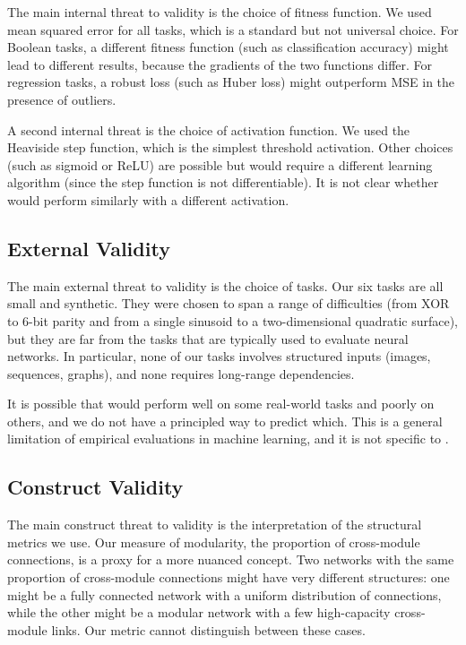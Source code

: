 The main internal threat to validity is the choice of fitness
function. We used mean squared error for all tasks, which is a
standard but not universal choice. For Boolean tasks, a different
fitness function (such as classification accuracy) might lead to
different results, because the gradients of the two functions differ.
For regression tasks, a robust loss (such as Huber loss) might
outperform MSE in the presence of outliers.

A second internal threat is the choice of activation function. We
used the Heaviside step function, which is the simplest threshold
activation. Other choices (such as sigmoid or ReLU) are possible but
would require a different learning algorithm (since the step function
is not differentiable). It is not clear whether \modnet{} would
perform similarly with a different activation.

\subsection{External Validity}
\label{sec:threats-external}

The main external threat to validity is the choice of tasks. Our six
tasks are all small and synthetic. They were chosen to span a range
of difficulties (from XOR to 6-bit parity and from a single sinusoid
to a two-dimensional quadratic surface), but they are far from the
tasks that are typically used to evaluate neural networks. In
particular, none of our tasks involves structured inputs (images,
sequences, graphs), and none requires long-range dependencies.

It is possible that \modnet{} would perform well on some real-world
tasks and poorly on others, and we do not have a principled way to
predict which. This is a general limitation of empirical evaluations
in machine learning, and it is not specific to \modnet{}.

\subsection{Construct Validity}
\label{sec:threats-construct}

The main construct threat to validity is the interpretation of the
structural metrics we use. Our measure of modularity, the proportion
of cross-module connections, is a proxy for a more nuanced concept.
Two networks with the same proportion of cross-module connections
might have very different structures: one might be a fully connected
network with a uniform distribution of connections, while the other
might be a modular network with a few high-capacity cross-module
links. Our metric cannot distinguish between these cases.

